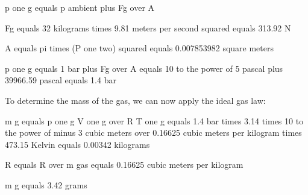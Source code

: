 p one g equals p ambient plus Fg over A

Fg equals 32 kilograms times 9.81 meters per second squared equals 313.92 N

A equals pi times (P one two) squared equals 0.007853982 square meters

p one g equals 1 bar plus Fg over A equals 10 to the power of 5 pascal plus 39966.59 pascal equals 1.4 bar

To determine the mass of the gas, we can now apply the ideal gas law:

m g equals p one g V one g over R T one g equals 1.4 bar times 3.14 times 10 to the power of minus 3 cubic meters over 0.16625 cubic meters per kilogram times 473.15 Kelvin equals 0.00342 kilograms

R equals R over m gas equals 0.16625 cubic meters per kilogram

m g equals 3.42 grams